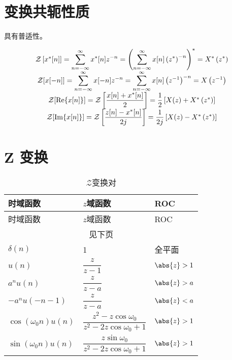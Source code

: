 \documentclass[cn,11pt,chinese,black,simple]{elegantbook}
\begin{document}
\section{变换共轭性质}

具有普适性。

\[
\begin{array}{c}
\mathcal{Z}\left[x^{*}[n]\right]=\displaystyle\sum_{n=-\infty}^{\infty} x^{*}[n] z^{-n}=\left(\displaystyle\sum_{n=-\infty}^{\infty} x[n]\left(z^{*}\right)^{-n}\right)^{*}=X^{*}\left(z^{*}\right) \\
\mathcal{Z}[x[-n]]=\displaystyle\sum_{n=-\infty}^{\infty} x[-n] z^{-n}=\displaystyle\sum_{n=-\infty}^{\infty} x[n]\left(z^{-1}\right)^{-n}=X\left(z^{-1}\right) \\
\mathcal{Z}[\operatorname{Re}\{x[n]\}]=\mathcal{Z}\left[\dfrac{x[n]+x^{*}[n]}{2}\right]=\dfrac{1}{2}\left[X(z)+X^{*}\left(z^{*}\right)\right] \\
\mathcal{Z}[\operatorname{Im}\{x[n]\}]=\mathcal{Z}\left[\dfrac{z[n]-x^{*}[n]}{2 j}\right]=\dfrac{1}{2 j}\left[X(z)-X^{*}\left(z^{*}\right)\right]
\end{array}
\]

\section{Z 变换}


\begin{longtable}{lll} 
    \caption{\(\mathscr{Z}\)变换对} \\ 
    \toprule
    时域函数 & \(z\)域函数 & ROC \\
    \midrule
    \endfirsthead
    
    \toprule
    时域函数 & \(z\)域函数 & ROC \\
    \midrule
    \endhead 
  
    \hline
    \multicolumn{3}{c}{见下页}\\   \bottomrule
    \endfoot
  
    \bottomrule
    \endlastfoot
    \(\delta(n)\) & 1 & 全平面\\
    \(u(n)\) & \(\dfrac{z}{z-1}\) & \(\abs{z}>1\) \\
    \(a^n u(n)\) & \(\dfrac{z}{z-a}\) & \(\abs{z}>a\) \\
    \(-a^n u(-n-1)\) & \(\dfrac{z}{z-a}\) & \(\abs{z}<a\)\\
    \(\cos(\omega_0 n)u(n)\) & \(\dfrac{z^2-z \cos \omega_0}{z^2 - 2 z \cos\omega_0 + 1}\) & \(\abs{z}>1\) \\
    \(\sin(\omega_0 n)u(n)\) & \(\dfrac{z \sin\omega_0}{z^2 -2 z \cos\omega_0 + 1}\) &  \(\abs{z}>1\) \\

\end{longtable}
  
\end{document}
